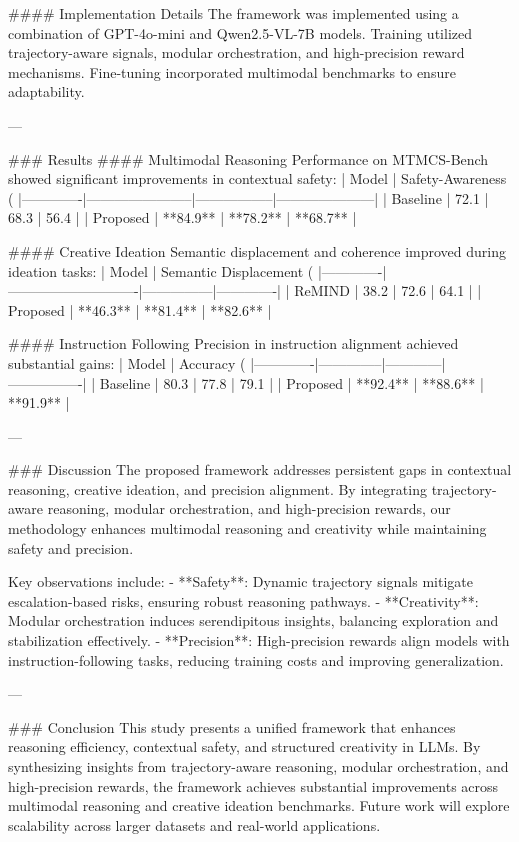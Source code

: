 #### Implementation Details
The framework was implemented using a combination of GPT-4o-mini and Qwen2.5-VL-7B models. Training utilized trajectory-aware signals, modular orchestration, and high-precision reward mechanisms. Fine-tuning incorporated multimodal benchmarks to ensure adaptability.

---

### Results
#### Multimodal Reasoning
Performance on MTMCS-Bench showed significant improvements in contextual safety:
| Model       | Safety-Awareness (%
|-------------|-----------------------|-----------------|---------------------|
| Baseline    | 72.1                 | 68.3            | 56.4                |
| Proposed    | **84.9**             | **78.2**        | **68.7**            |

#### Creative Ideation
Semantic displacement and coherence improved during ideation tasks:
| Model       | Semantic Displacement (%
|-------------|----------------------------|---------------|-------------|
| ReMIND      | 38.2                       | 72.6          | 64.1        |
| Proposed    | **46.3**                   | **81.4**      | **82.6**    |

#### Instruction Following
Precision in instruction alignment achieved substantial gains:
| Model       | Accuracy (%
|-------------|--------------|------------|----------------|
| Baseline    | 80.3         | 77.8       | 79.1           |
| Proposed    | **92.4**     | **88.6**   | **91.9**       |

---

### Discussion
The proposed framework addresses persistent gaps in contextual reasoning, creative ideation, and precision alignment. By integrating trajectory-aware reasoning, modular orchestration, and high-precision rewards, our methodology enhances multimodal reasoning and creativity while maintaining safety and precision.

Key observations include:
- **Safety**: Dynamic trajectory signals mitigate escalation-based risks, ensuring robust reasoning pathways.
- **Creativity**: Modular orchestration induces serendipitous insights, balancing exploration and stabilization effectively.
- **Precision**: High-precision rewards align models with instruction-following tasks, reducing training costs and improving generalization.

---

### Conclusion
This study presents a unified framework that enhances reasoning efficiency, contextual safety, and structured creativity in LLMs. By synthesizing insights from trajectory-aware reasoning, modular orchestration, and high-precision rewards, the framework achieves substantial improvements across multimodal reasoning and creative ideation benchmarks. Future work will explore scalability across larger datasets and real-world applications.

